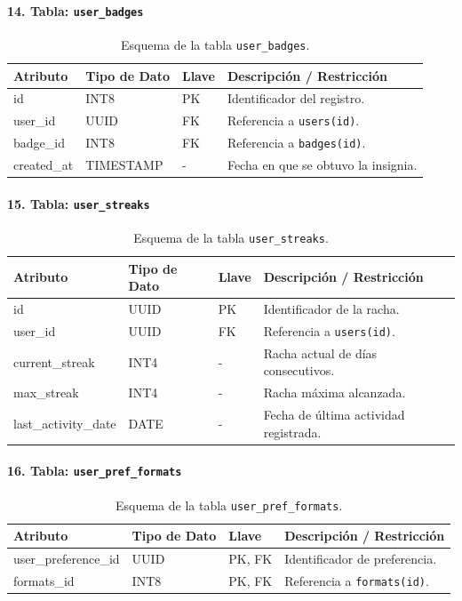 \documentclass[12pt, atypical, journal]{article}
\begin{document}
\paragraph{14. Tabla: \texttt{user\_badges}}
\begin{table}[H]
	\centering
	\begin{tabular}{|l|l|l|p{6.5cm}|}
		\hline
		\textbf{Atributo} & \textbf{Tipo de Dato} & \textbf{Llave} & \textbf{Descripción / Restricción} \\ \hline
		id & INT8 & PK & Identificador del registro. \\ \hline
		user\_id & UUID & FK & Referencia a \texttt{users(id)}. \\ \hline
		badge\_id & INT8 & FK & Referencia a \texttt{badges(id)}. \\ \hline
		created\_at & TIMESTAMP & - & Fecha en que se obtuvo la insignia. \\ \hline
	\end{tabular}
	\caption{Esquema de la tabla \texttt{user\_badges}.}
\end{table}

\paragraph{15. Tabla: \texttt{user\_streaks}}
\begin{table}[H]
	\centering
	\begin{tabular}{|l|l|l|p{6.5cm}|}
		\hline
		\textbf{Atributo} & \textbf{Tipo de Dato} & \textbf{Llave} & \textbf{Descripción / Restricción} \\ \hline
		id & UUID & PK & Identificador de la racha. \\ \hline
		user\_id & UUID & FK & Referencia a \texttt{users(id)}. \\ \hline
		current\_streak & INT4 & - & Racha actual de días consecutivos. \\ \hline
		max\_streak & INT4 & - & Racha máxima alcanzada. \\ \hline
		last\_activity\_date & DATE & - & Fecha de última actividad registrada. \\ \hline
	\end{tabular}
	\caption{Esquema de la tabla \texttt{user\_streaks}.}
\end{table}

\paragraph{16. Tabla: \texttt{user\_pref\_formats}}
\begin{table}[H]
	\centering
	\begin{tabular}{|l|l|l|p{6.5cm}|}
		\hline
		\textbf{Atributo} & \textbf{Tipo de Dato} & \textbf{Llave} & \textbf{Descripción / Restricción} \\ \hline
		user\_preference\_id & UUID & PK, FK & Identificador de preferencia. \\ \hline
		formats\_id & INT8 & PK, FK & Referencia a \texttt{formats(id)}. \\ \hline
	\end{tabular}
	\caption{Esquema de la tabla \texttt{user\_pref\_formats}.}
\end{table}
\end{document}
